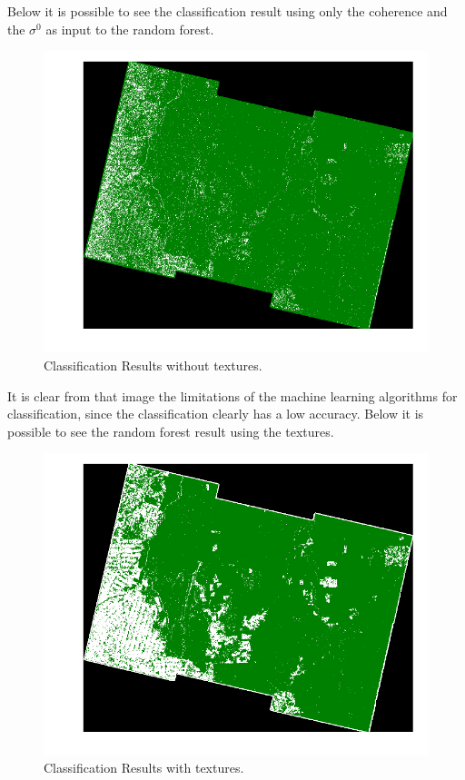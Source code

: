 Below it is possible to see the classification result using only the coherence and the $\sigma^0$ as input to the random forest.
\begin{figure}[H]
    \centering
    \includegraphics[width=\linewidth]{Chapter5/TANDEM-X/result_no_texturesimage.pdf}
    \caption{Classification Results without textures.}
    \label{fig:result_no_textures_sentinel}
\end{figure}{}
It is clear from that image the limitations of the machine learning algorithms for classification, since the classification clearly has a low accuracy. Below it is possible to see the random forest result using the textures.

\begin{figure}[H]
    \centering
    \includegraphics[width=\linewidth]{Chapter5/TANDEM-X/result_texturesimage.pdf}
    \caption{Classification Results with textures.}
    \label{fig:result_textures_sentinel}
\end{figure}{}

